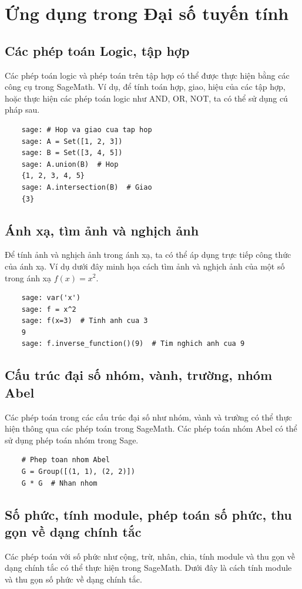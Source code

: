 \section{Ứng dụng trong Đại số tuyến tính}

\subsection{Các phép toán Logic, tập hợp}
Các phép toán logic và phép toán trên tập hợp có thể được thực hiện bằng các công cụ trong SageMath. Ví dụ, để tính toán hợp, giao, hiệu của các tập hợp, hoặc thực hiện các phép toán logic như AND, OR, NOT, ta có thể sử dụng cú pháp sau.

\begin{lstlisting}
	sage: # Hop va giao cua tap hop
	sage: A = Set([1, 2, 3])
	sage: B = Set([3, 4, 5])
	sage: A.union(B)  # Hop
	{1, 2, 3, 4, 5}
	sage: A.intersection(B)  # Giao
	{3}
\end{lstlisting}

\subsection{Ánh xạ, tìm ảnh và nghịch ảnh}
Để tính ảnh và nghịch ảnh trong ánh xạ, ta có thể áp dụng trực tiếp công thức của ánh xạ. Ví dụ dưới đây minh họa cách tìm ảnh và nghịch ảnh của một số trong ánh xạ \( f(x) = x^2 \).

\begin{lstlisting}
	sage: var('x')
	sage: f = x^2
	sage: f(x=3)  # Tinh anh cua 3
	9
	sage: f.inverse_function()(9)  # Tim nghich anh cua 9
\end{lstlisting}

\subsection{Cấu trúc đại số nhóm, vành, trường, nhóm Abel}
Các phép toán trong các cấu trúc đại số như nhóm, vành và trường có thể thực hiện thông qua các phép toán trong SageMath. Các phép toán nhóm Abel có thể sử dụng phép toán nhóm trong Sage.

\begin{lstlisting}
	# Phep toan nhom Abel
	G = Group([(1, 1), (2, 2)])
	G * G  # Nhan nhom
\end{lstlisting}

\subsection{Số phức, tính module, phép toán số phức, thu gọn về dạng chính tắc}
Các phép toán với số phức như cộng, trừ, nhân, chia, tính module và thu gọn về dạng chính tắc có thể thực hiện trong SageMath. Dưới đây là cách tính module và thu gọn số phức về dạng chính tắc.

